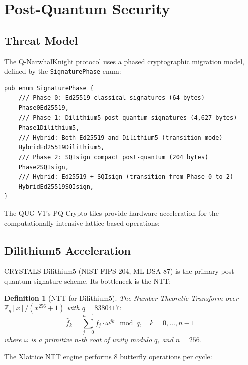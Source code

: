 \documentclass[11pt,a4paper]{article}
\newtheorem{definition}[theorem]{Definition}
\begin{document}
\section{Post-Quantum Security}
\label{sec:pq}

\subsection{Threat Model}

The Q-NarwhalKnight protocol uses a phased cryptographic migration model, defined by the \texttt{SignaturePhase} enum:

\begin{lstlisting}[style=rust,caption={Signature Phases (from \texttt{crates/q-types/src/block.rs})}]
pub enum SignaturePhase {
    /// Phase 0: Ed25519 classical signatures (64 bytes)
    Phase0Ed25519,
    /// Phase 1: Dilithium5 post-quantum signatures (4,627 bytes)
    Phase1Dilithium5,
    /// Hybrid: Both Ed25519 and Dilithium5 (transition mode)
    HybridEd25519Dilithium5,
    /// Phase 2: SQIsign compact post-quantum (204 bytes)
    Phase2SQIsign,
    /// Hybrid: Ed25519 + SQIsign (transition from Phase 0 to 2)
    HybridEd25519SQIsign,
}
\end{lstlisting}

The QUG-V1's PQ-Crypto tiles provide hardware acceleration for the computationally intensive lattice-based operations:

\subsection{Dilithium5 Acceleration}

CRYSTALS-Dilithium5 (NIST FIPS 204, ML-DSA-87) is the primary post-quantum signature scheme. Its bottleneck is the NTT:

\begin{definition}[NTT for Dilithium5]
The Number Theoretic Transform over $\mathbb{Z}_q[x]/(x^{256} + 1)$ with $q = 8380417$:
\begin{equation}
    \hat{f}_k = \sum_{j=0}^{n-1} f_j \cdot \omega^{jk} \mod q, \quad k = 0, \ldots, n-1
\end{equation}
where $\omega$ is a primitive $n$-th root of unity modulo $q$, and $n = 256$.
\end{definition}

The Xlattice NTT engine performs 8 butterfly operations per cycle:
\end{document}
